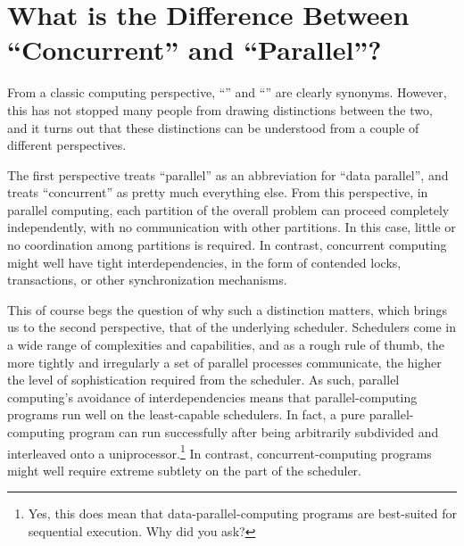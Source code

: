 
\section{What is the Difference Between ``Concurrent'' and ``Parallel''?}
\label{sec:app:questions:What is the Difference Between ``Concurrent'' and ``Parallel''?}

From a classic computing perspective, ``'' and ``''
are clearly synonyms.
However, this has not stopped many people from drawing distinctions
between the two, and it turns out that these distinctions can be
understood from a couple of different perspectives.

The first perspective treats ``parallel'' as an abbreviation for
``data parallel'', and treats ``concurrent'' as pretty much everything
else.
From this perspective, in parallel computing, each partition of the
overall problem can proceed completely independently, with no
communication with other partitions.
In this case, little or no coordination among partitions is required.
In contrast, concurrent computing might well have tight interdependencies,
in the form of contended locks, transactions, or other synchronization
mechanisms.

\QuickQuizEnd

This of course begs the question of why such a distinction matters,
which brings us to the second perspective, that of the underlying scheduler.
Schedulers come in a wide range of complexities and capabilities, and
as a rough rule of thumb, the more tightly and irregularly a set of
parallel processes communicate, the higher the level of sophistication
required from the scheduler.
As such, parallel computing's avoidance of interdependencies means that
parallel-computing programs run well on the least-capable schedulers.
In fact, a pure parallel-computing program can run successfully after
being arbitrarily subdivided and interleaved onto a uniprocessor.\footnote{
	Yes, this does mean that data-parallel-computing programs are
	best-suited for sequential execution.
	Why did you ask?}
In contrast, concurrent-computing programs might well require extreme
subtlety on the part of the scheduler.

